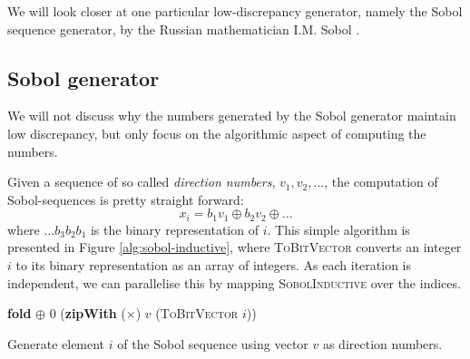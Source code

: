 
We will look closer at one particular low-discrepancy generator,
namely the Sobol sequence generator, by the Russian mathematician
I.M. Sobol \cite{sobol1967}. 


\subsection{Sobol generator}
We will not discuss why the numbers generated by the Sobol generator
maintain low discrepancy, but only focus on the algorithmic aspect of
computing the numbers.

Given a sequence of so called \emph{direction numbers}, $v_1, v_2,
\ldots$, the computation of Sobol-sequences is pretty straight forward:
$$x_i = b_1v_1 \oplus b_2v_2 \oplus \ldots$$
where $\ldots b_3b_2b_1$ is the binary representation of $i$. This
simple algorithm is presented in Figure \ref{alg:sobol-inductive},
where \textsc{ToBitVector} converts an integer $i$ to its binary
representation as an array of integers. As each iteration is
independent, we can parallelise this by mapping
\textsc{SobolInductive} over the indices.

\begin{algorithm}
  \begin{algorithmic}
    \State \Return \textbf{fold} $\oplus$ 0 (\textbf{zipWith} ($\times$) $v$ (\textsc{ToBitVector} $i$))
    \EndFunction
  \end{algorithmic}
  \caption{Generate element $i$ of the Sobol sequence using vector
    $v$ as direction numbers.}
  \label{alg:sobol-inductive}
\end{algorithm}


